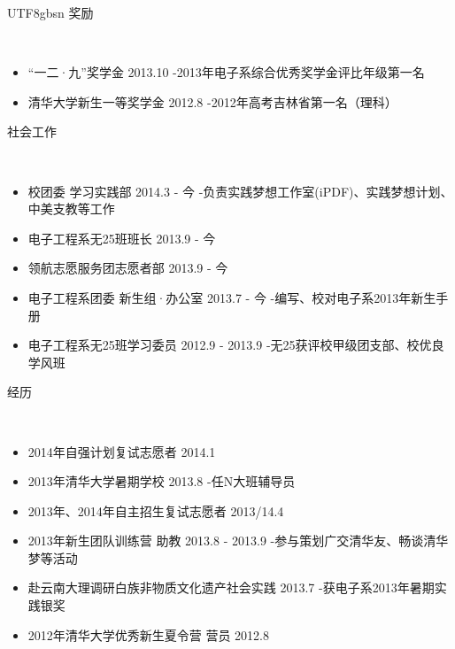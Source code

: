 \documentclass{article}
\newenvironment{changemargin}[2]{%
  \begin{list}{}{%
    \setlength{\topsep}{0pt}%
    \setlength{\leftmargin}{#1}%
    \setlength{\rightmargin}{#2}%
    \setlength{\listparindent}{\parindent}%
    \setlength{\itemindent}{\parindent}%
    \setlength{\parsep}{\parskip}%
  }%
  \item[]}{\end{list}
}
\newcommand{\lineover}{
	\begin{changemargin}{-0.05in}{-0.05in}
		\vspace*{-8pt}
		\hrulefill \\
		\vspace*{-2pt}
	\end{changemargin}
}
\newcommand{\header}[1]{
	\begin{changemargin}{-0.5in}{-0.5in}
		\scshape{#1}\\
  	\lineover
	\end{changemargin}
}
\newenvironment{body} {
	\vspace*{-16pt}
	\begin{changemargin}{-0.25in}{-0.5in}
  }	
	{\end{changemargin}
}
\begin{document}
\begin{CJK*}{UTF8}{gbsn}
奖励
\lineover
\begin{itemize}
\item ``一二·九''奖学金 \hfill 2013.10
\subitem -2013年电子系综合优秀奖学金评比年级第一名
\item 清华大学新生一等奖学金 \hfill 2012.8
\subitem -2012年高考吉林省第一名（理科）
\end{itemize}
社会工作
\lineover
\begin{itemize}
\item 校团委 学习实践部 \hfill 2014.3 - 今
\subitem -负责实践梦想工作室(iPDF)、实践梦想计划、中美支教等工作
\item 电子工程系无25班班长 \hfill 2013.9 - 今
\item 领航志愿服务团志愿者部 \hfill 2013.9 - 今
\item 电子工程系团委 新生组·办公室 \hfill 2013.7 - 今
\subitem -编写、校对电子系2013年新生手册
\item 电子工程系无25班学习委员 \hfill 2012.9 - 2013.9
\subitem -无25获评校甲级团支部、校优良学风班
\end{itemize}
经历
\lineover
\begin{itemize}
\item 2014年自强计划复试志愿者 \hfill 2014.1
\item 2013年清华大学暑期学校 \hfill 2013.8
\subitem -任N大班辅导员
\item 2013年、2014年自主招生复试志愿者 \hfill 2013/14.4
\item 2013年新生团队训练营 助教 \hfill 2013.8 - 2013.9
\subitem -参与策划广交清华友、畅谈清华梦等活动
\item 赴云南大理调研白族非物质文化遗产社会实践 \hfill 2013.7
\subitem -获电子系2013年暑期实践银奖
\item 2012年清华大学优秀新生夏令营 营员 \hfill 2012.8
\end{itemize}


%
%


\end{CJK*}
\end{document}
